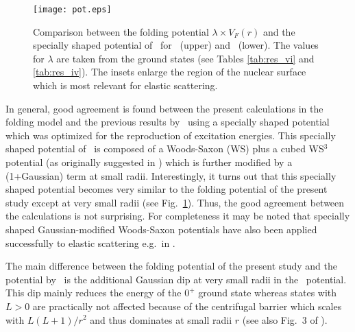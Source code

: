 %
\begin{figure}[htb]
  \texttt{[image: pot.eps]}
\caption{
Comparison between the folding potential $\lambda \times V_F(r)$ and the
specially shaped potential of \SM\ for \crvi\ (upper) and \criv\ (lower). The
values for $\lambda$ are taken from the ground states (see Tables
\ref{tab:res_vi} and \ref{tab:res_iv}). The insets enlarge the region of the
nuclear surface which is most relevant for elastic scattering.
}
\label{fig:pot}
\end{figure}
%
In general, good agreement is found between the present calculations in the
folding model and the previous results by \SM\ using a specially shaped
potential which was optimized for the reproduction of excitation
energies. This specially shaped potential of \SM\ is composed of a Woods-Saxon
(WS) plus a cubed WS$^3$ potential (as originally suggested in \cite{Buck95})
which is further modified by a (1+Gaussian) term at small
radii. Interestingly, it turns out that this specially shaped potential
becomes very similar to the folding potential of the present study except at
very small radii (see Fig.~\ref{fig:pot}). Thus, the good agreement between
the calculations is not surprising. For completeness it may be noted that
specially shaped Gaussian-modified Woods-Saxon potentials have also been
applied successfully to elastic scattering e.g.\ in \cite{Mic83,Mic00}.

The main difference between the folding potential of the present study and the
potential by \SM\ is the additional Gaussian dip at very small radii in the
\SM\ potential. This dip mainly reduces the energy of the $0^+$ ground state
whereas states with $L > 0$ are practically not affected because of the
centrifugal barrier which scales with $L(L+1)/r^2$ and thus dominates at small
radii $r$ (see also Fig.~3 of \SM ).

